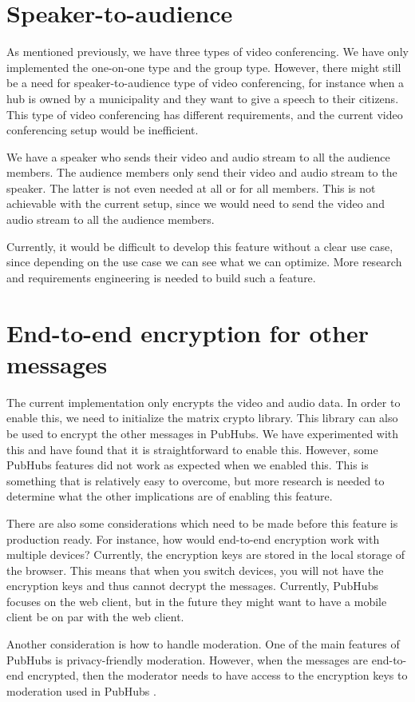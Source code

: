 \documentclass{report}
\begin{document}
\section{Speaker-to-audience}
As mentioned previously, we have three types of video conferencing. We have only implemented the one-on-one type and
the group type. However, there might still be a need for speaker-to-audience type of video conferencing, for instance
when a hub is owned by a municipality and they want to give a speech to their citizens. This type of video conferencing
has different requirements, and the current video conferencing setup would be inefficient.

We have a speaker who sends their video and audio stream to all the audience members. The audience members only send
their video and audio stream to the speaker. The latter is not even needed at all or for all members. This is not
achievable with the current setup, since we would need to send the video and audio stream to all the audience members.

Currently, it would be difficult to develop this feature without a clear use case, since depending on the use case we can
see what we can optimize. More research and requirements engineering is needed to build such a feature.

\section{End-to-end encryption for other messages}\label{sec:encryption_of_messages}
The current implementation only encrypts the video and audio data. In order to enable this, we need to initialize the
matrix crypto library. This library can also be used to encrypt the other messages in PubHubs. We have experimented
with this and have found that it is straightforward to enable this. However, some PubHubs features did not work as expected
when we enabled this. This is something that is relatively easy to overcome, but more research is needed to determine
what the other implications are of enabling this feature.

There are also some considerations which need to be made before this feature is production ready.
For instance, how would end-to-end encryption work with multiple devices? Currently, the encryption keys are stored in
the local storage of the browser. This means that when you switch devices, you will not have the encryption keys and
thus cannot decrypt the messages. Currently, PubHubs focuses on the web client, but in the future they might want to
have a mobile client be on par with the web client.

Another consideration is how to handle moderation. One of the main features of PubHubs is privacy-friendly moderation.
However, when the messages are end-to-end encrypted, then the moderator needs to have access to the encryption keys to
moderation used in PubHubs \cite{noauthor_group_nodate}.

\newpage


\end{document}
